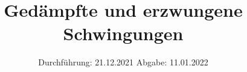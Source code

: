 

\subject{Versuch 354}
\title{Gedämpfte und erzwungene Schwingungen}
\date{%
  Durchführung: 21.12.2021
  \hspace{3em}
  Abgabe: 11.01.2022
}



\maketitle
\thispagestyle{empty}
\tableofcontents
\newpage






\nocite{*}
\printbibliography{}


